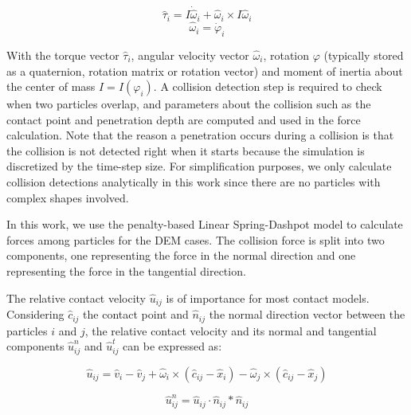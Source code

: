 \documentclass[Afour,sageh,times]{sagej}
\begin{document}
\begin{equation}
    \hat{\tau}{_i} = I \dot{\hat \omega}_i + {\hat \omega}_i \times I {\hat \omega}_i \label{eq:newton_torque}
\end{equation}
\begin{equation}
    \hat{\omega}{_i} = \dot{\varphi}_i \label{eq:newton_angular_velocity}
\end{equation}

With the torque vector $\hat{\tau}{_i}$, angular velocity vector $\hat{\omega}{_i}$, rotation $\varphi$ (typically stored as a quaternion, rotation matrix or rotation vector) and moment of inertia about the center of mass $I = I(\varphi_i)$.
A collision detection step is required to check when two particles overlap, and parameters about the collision such as the contact point and penetration depth are computed and used in the force calculation.
Note that the reason a penetration occurs during a collision is that the collision is not detected right when it starts because the simulation is discretized by the time-step size.
For simplification purposes, we only calculate collision detections analytically in this work since there are no particles with complex shapes involved.

In this work, we use the penalty-based Linear Spring-Dashpot model to calculate forces among particles for the DEM cases.
The collision force is split into two components, one representing the force in the normal direction and one representing the force in the tangential direction.

The relative contact velocity $\hat{u}_{ij}$ is of importance for most contact models.
Considering $\hat{c}_{ij}$ the contact point and $\hat{n}_{ij}$ the normal direction vector between the particles $i$ and $j$, the relative contact velocity and its normal and tangential components $\hat{u}_{ij}^{n}$ and $\hat{u}_{ij}^{t}$ can be expressed as:


\begin{equation}
    \hat{u}_{ij} = \hat{v}_{i} - \hat{v}_{j} + \hat{\omega}_{i} \times (\hat{c}_{ij} - \hat{x}_{i}) - \hat{\omega}_{j} \times (\hat{c}_{ij} - \hat{x}_{j})
    \label{eq:relative_contact_velocity}
\end{equation}

\begin{equation}
    \hat{u}_{ij}^{n} = \hat{u}_{ij} \cdot \hat{n}_{ij} * \hat{n}_{ij}
    \label{eq:relative_contact_velocity_n}
\end{equation}
\end{document}
